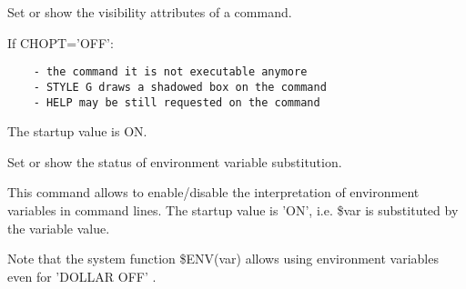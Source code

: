 \ENDCBIG


\BEGARG
{}
\ENDARG
{}
\ENDOPT

   \par
Set or show the visibility attributes of a command.  

   \par
If CHOPT='OFF':  
\begin{verbatim}
    - the command it is not executable anymore
    - STYLE G draws a shadowed box on the command
    - HELP may be still requested on the command
\end{verbatim}
   \par
The startup value is ON.  

\ENDCMD


\BEGARG
{}
\ENDARG
{}
\ENDOPT

   \par
Set or show the status of environment variable substitution.  

   \par
This command allows to enable/disable the interpretation of environment 
   variables in command lines.  The startup value is 'ON', i.e. 
   \DQUOTE{}\$var\DQUOTE{} is substituted by the variable value.  

   \par
Note that the system function \DQUOTE{}\$ENV(var)\DQUOTE{} allows using 
   environment variables even for 'DOLLAR OFF' .  

\ENDCMD


\BEGARG
{}
\ENDARG
{}
\ENDOPT

